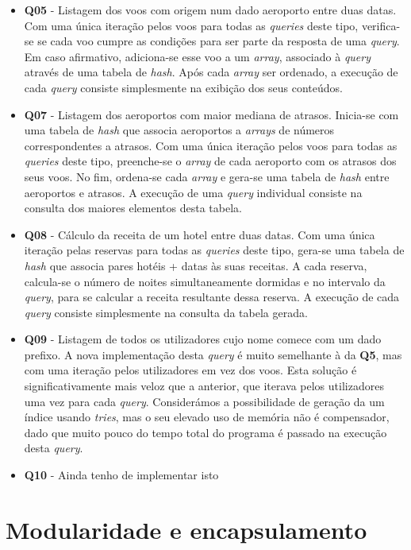 \documentclass[12pt, a4paper]{article}
\begin{document}
\begin{itemize}
    \item \textbf{Q05} - Listagem dos voos com origem num dado aeroporto entre duas datas. Com uma
                         única iteração pelos voos para todas as \emph{queries} deste tipo,
                         verifica-se se cada voo cumpre as condições para ser parte da resposta
                         de uma \emph{query}. Em caso afirmativo, adiciona-se esse voo a um
                         \emph{array}, associado à \emph{query} através de uma tabela de
                         \emph{hash}. Após cada \emph{array} ser ordenado, a execução de cada
                         \emph{query} consiste simplesmente na exibição dos seus conteúdos.

    \item \textbf{Q07} - Listagem dos aeroportos com maior mediana de atrasos. Inicia-se com uma
                         tabela de \emph{hash} que associa aeroportos a \emph{arrays} de números
                         correspondentes a atrasos. Com uma única iteração pelos voos para todas
                         as \emph{queries} deste tipo, preenche-se o \emph{array} de cada aeroporto
                         com os atrasos dos seus voos. No fim, ordena-se cada \emph{array} e gera-se
                         uma tabela de \emph{hash} entre aeroportos e atrasos. A execução de uma
                         \emph{query} individual consiste na consulta dos maiores elementos desta
                         tabela.

    \item \textbf{Q08} - Cálculo da receita de um hotel entre duas datas. Com uma única iteração
                         pelas reservas para todas as \emph{queries} deste tipo, gera-se uma tabela
                         de \emph{hash} que associa pares hotéis + datas às suas receitas. A cada
                         reserva, calcula-se o número de noites simultaneamente dormidas e no
                         intervalo da \emph{query}, para se calcular a receita resultante dessa
                         reserva. A execução de cada \emph{query} consiste simplesmente na consulta
                         da tabela gerada.

    \item \textbf{Q09} - Listagem de todos os utilizadores cujo nome comece com um dado prefixo. A
                         nova implementação desta \emph{query} é muito semelhante à da \textbf{Q5},
                         mas com uma iteração pelos utilizadores em vez dos voos. Esta solução é
                         significativamente mais veloz que a anterior, que iterava pelos
                         utilizadores uma vez para cada \emph{query}. Considerámos a possibilidade
                         de geração da um índice usando \emph{tries}, mas o seu elevado uso de
                         memória não é compensador, dado que muito pouco do tempo total do programa
                         é passado na execução desta \emph{query}.

    \item \textbf{Q10} - {\color{red}Ainda tenho de implementar isto}
\end{itemize}

\section{Modularidade e encapsulamento}
\label{sec:modularity-and-encapsulation}
\end{document}
